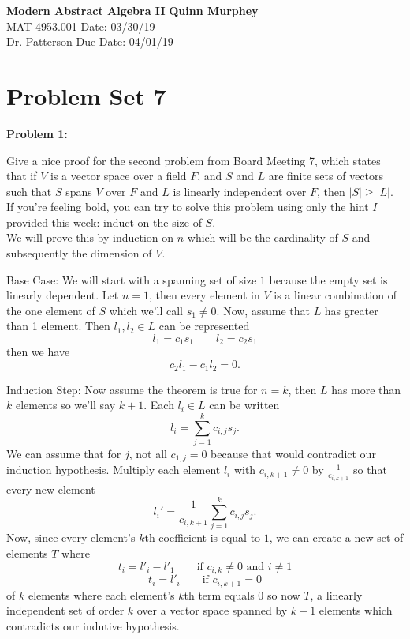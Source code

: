\documentclass[letter paper, 12pt]{article}
\begin{document}
\noindent
\large\textbf{Modern Abstract Algebra II} \hfill \textbf{Quinn Murphey} \\
\normalsize MAT 4953.001 \hfill Date: 03/30/19 \\
Dr. Patterson \hfill Due Date: 04/01/19 \\
\noindent\makebox[\linewidth]{\rule{\paperwidth}{0.4pt}}

\section*{Problem Set 7}
\doublespacing
\noindent\textbf{Problem 1:}
    
    Give a nice proof for the second problem from Board Meeting 7, which states that if $V$ is a vector space over a field $F$, and $S$ and $L$ are finite sets of vectors such that $S$ spans $V$ over $F$ and $L$ is linearly independent over $F$, then $\lvert S\rvert \geq \lvert L\rvert$. If you're feeling bold, you can try to solve this problem using only the hint $I$ provided this week: induct on the size of $S$.\\
    
    We will prove this by induction on $n$ which will be the cardinality of $S$ and subsequently the dimension of $V$. 
    
    Base Case: We will start with a spanning set of size $1$ because the empty set is linearly dependent. Let $n=1$, then every element in $V$ is a linear combination of the one element of $S$ which we'll call $s_1 \not= 0$. Now, assume that $L$ has greater than 1 element. Then $l_1,l_2\in L$ can be represented 
    $$l_1 = c_1s_1 \qquad l_2 = c_2s_1$$
    then we have
    $$c_2l_1 - c_1l_2 = 0.$$
    
    Induction Step: Now assume the theorem is true for $n=k$, then $L$ has more than $k$ elements so we'll say $k+1$. Each $l_i\in L$ can be written
    $$l_i = \sum_{j=1}^{k}c_{i,j}s_j.$$
    We can assume that for $j$, not all $c_{1,j} = 0$ because that would contradict our induction hypothesis. Multiply each element $l_i$ with $c_{i,k+1} \not= 0$ by $\frac{1}{c_{i,k+1}}$ so that every new element $$l_i'=\frac{1}{c_{i,k+1}}\sum_{j=1}^{k}c_{i,j}s_j.$$ 
    Now, since every element's $k$th coefficient is equal to $1$, we can create a new set of elements $T$ where 
    $$t_i = l'_i - l'_1 \qquad \text{if }c_{i,k}\not=0 \text{ and } i \not= 1$$
    $$t_i = l'_i \qquad \text{if } c_{i,k+1}=0 $$ 
    of $k$ elements where each element's $k$th term equals $0$ so now $T$, a linearly independent set of order $k$ over a vector space spanned by $k-1$ elements which contradicts our indutive hypothesis.
    
\end{document}

